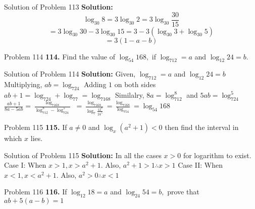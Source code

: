 \documentclass[aspectratio=169,8pt]{beamer}
\begin{document}
\begin{frame}{Solution of Problem 113}
  \textbf{Solution:} $$\log_{30}8 = 3\log_{30}2 = 3\log_{30}\frac{30}{15}$$
  $$=3\log_{30}30 - 3\log_{30}15 = 3 - 3(\log_{30}3 + \log_{30}5)$$
  $$= 3(1 - a - b)$$
\end{frame}
\begin{frame}{Problem 114}
  \textbf{114.} Find the value of $\log_{54}168,$ if $\log_712 =a $ and $\log_{12}24 = b.$
\end{frame}
\begin{frame}{Solution of Problem 114}
  \textbf{Solution:} Given, $\log_712 = a$ and $\log_{12}24 = b$
  \linebreak\linebreak
  Multiplying, $ab = \log_724$
  \linebreak\linebreak
  Adding $1$ on both sides
  \linebreak\linebreak
  $ab + 1 = \log_724 + \log_77 = \log_7168$
  \linebreak\linebreak
  Similalry, $8a = \log_712^8$ and $5ab = \log_724^5$
  \linebreak\linebreak
  $\frac{ab + 1}{8a - 5ab} = \frac{\log_7168}{\log_712^8 - \log_724^5}$
  \linebreak\linebreak
  $= \frac{\log_7168}{\log_7\frac{12^8}{24^5}} = \frac{\log_7168}{\log_754} = \log_{54}168$
\end{frame}
\begin{frame}{Problem 115}
  \textbf{115.} If $a\neq 0$ and $\log_x(a^2 + 1) < 0$ then find the interval in which $x$ lies.
\end{frame}
\begin{frame}{Solution of Problem 115}
  \textbf{Solution:} In all the cases $x > 0$ for logarithm to exist.
  \linebreak\linebreak
  Case I: When $x > 1, x > a^2 + 1.$ Also, $a^2 + 1 > 1 \therefore x > 1$
  \linebreak\linebreak
  Case II: When $x < 1, x < a^2 + 1.$ Also, $a^2 > 0 \therefore x < 1$
\end{frame}
\begin{frame}{Problem 116}
  \textbf{116.} If $\log_{12}18 = a$ and $\log_{24}54 = b,$ prove that $ab + 5(a - b) = 1$
\end{frame}
\end{document}
